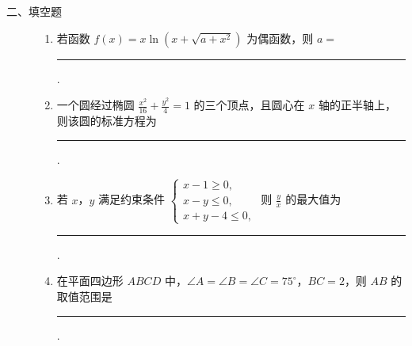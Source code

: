 \begin{description}

    \item[二、填空题]

    \begin{enumerate}[leftmargin=5pt]

      \addtocounter{enumi}{+12}

        \item 若函数 \( f(x) = x \ln \left( x + \sqrt{a + x^2} \right) \) 为偶函数，则 \( a = \)\rule[-0.3ex]{3em}{0.4pt}.

        \item 一个圆经过椭圆 \(\frac{x^2}{16} + \frac{y^2}{4} = 1\) 的三个顶点，且圆心在 \(x\) 轴的正半轴上，则该圆的标准方程为\rule[-0.3ex]{3em}{0.4pt}.

        \item 若 \(x\)，\(y\) 满足约束条件 \(\begin{cases}
x - 1 \geqslant 0,\\
x - y \leqslant 0,\\
x + y - 4 \leqslant 0,
\end{cases}\) 则 \(\frac{y}{x}\) 的最大值为\rule[-0.3ex]{3em}{0.4pt}.

        \item 在平面四边形 \(ABCD\) 中，\(\angle A = \angle B = \angle C = 75^{\circ}\)，\(BC = 2\)，则 \(AB\) 的取值范围是\rule[-0.3ex]{3em}{0.4pt}.

    \end{enumerate}

\end{description}

